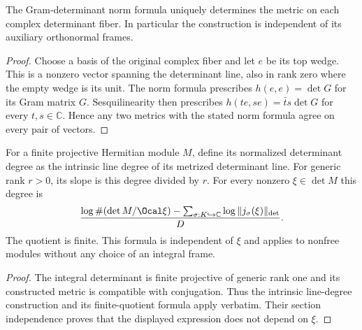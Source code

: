 \begin{lemma}
\label{lem:determinant-metric-unique}\leanok
The Gram-determinant norm formula uniquely determines the metric on each
complex determinant fiber. In particular the construction is independent
of its auxiliary orthonormal frames.
\end{lemma}
\begin{proof}
Choose a basis of the original complex fiber and let $e$ be its top wedge.
This is a nonzero vector spanning the determinant line, also in rank zero
where the empty wedge is its unit. The norm formula prescribes
$h(e,e)=\det G$ for its Gram matrix $G$. Sesquilinearity then prescribes
$h(te,se)=\bar t s\det G$ for every $t,s\in\mathbb C$. Hence any two
metrics with the stated norm formula agree on every pair of vectors.
\end{proof}

\begin{definition}
\label{def:intrinsic-determinant-degree}
\leanok
For a finite projective Hermitian module $M$, define its normalized determinant
degree as the intrinsic line degree of its metrized determinant line.
For generic rank $r>0$, its slope is this degree divided by $r$.
For every nonzero $\xi\in\det M$ this degree is
\[
 \frac{\log\#(\det M/\Ocal\xi)
 -\sum_{\sigma:K\hookrightarrow\mathbb C}\log\|j_\sigma(\xi)\|_{\det}}{D}.
\]
The quotient is finite. This formula is independent of $\xi$ and applies
to nonfree modules without any choice of an integral frame.
\end{definition}
\begin{proof}
The integral determinant is finite projective of generic rank one and its
constructed metric is compatible with conjugation. Thus the intrinsic
line-degree construction and its finite-quotient formula apply verbatim.
Their section independence proves that the displayed expression does not
depend on $\xi$.
\end{proof}

